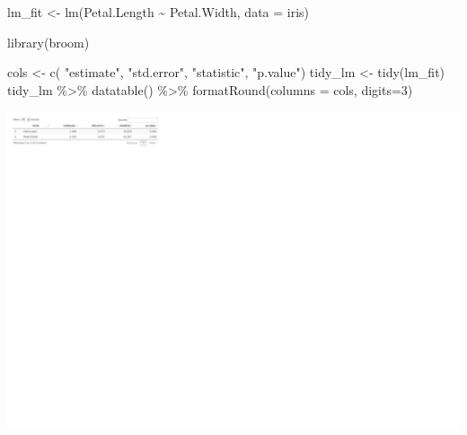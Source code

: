 \documentclass[
  ignorenonframetext,
]{beamer}
\newenvironment{Shaded}{\begin{snugshade}}{\end{snugshade}}
\newcommand{\AttributeTok}[1]{\textcolor[rgb]{0.40,0.45,0.13}{#1}}
\newcommand{\DecValTok}[1]{\textcolor[rgb]{0.68,0.00,0.00}{#1}}
\newcommand{\FunctionTok}[1]{\textcolor[rgb]{0.28,0.35,0.67}{#1}}
\newcommand{\NormalTok}[1]{\textcolor[rgb]{0.00,0.23,0.31}{#1}}
\newcommand{\OtherTok}[1]{\textcolor[rgb]{0.00,0.23,0.31}{#1}}
\newcommand{\SpecialCharTok}[1]{\textcolor[rgb]{0.37,0.37,0.37}{#1}}
\newcommand{\StringTok}[1]{\textcolor[rgb]{0.13,0.47,0.30}{#1}}
\begin{document}
\begin{frame}[fragile]
\begin{Shaded}
\begin{Highlighting}[]
\NormalTok{lm\_fit }\OtherTok{\textless{}{-}} \FunctionTok{lm}\NormalTok{(Petal.Length }\SpecialCharTok{\textasciitilde{}}\NormalTok{ Petal.Width, }\AttributeTok{data =}\NormalTok{ iris)}

\FunctionTok{library}\NormalTok{(broom)}
\end{Highlighting}
\end{Shaded}
\end{frame}

\begin{frame}[fragile]
\begin{Shaded}
\begin{Highlighting}[]
\NormalTok{cols }\OtherTok{\textless{}{-}} \FunctionTok{c}\NormalTok{( }\StringTok{"estimate"}\NormalTok{, }\StringTok{"std.error"}\NormalTok{, }\StringTok{"statistic"}\NormalTok{, }\StringTok{"p.value"}\NormalTok{)}
\NormalTok{tidy\_lm }\OtherTok{\textless{}{-}} \FunctionTok{tidy}\NormalTok{(lm\_fit) }
\NormalTok{tidy\_lm }\SpecialCharTok{\%\textgreater{}\%} \FunctionTok{datatable}\NormalTok{() }\SpecialCharTok{\%\textgreater{}\%}
\FunctionTok{formatRound}\NormalTok{(}\AttributeTok{columns =}\NormalTok{ cols,  }\AttributeTok{digits=}\DecValTok{3}\NormalTok{)}
\end{Highlighting}
\end{Shaded}

\includegraphics{functions_R_files/figure-beamer/unnamed-chunk-3-1.pdf}
\end{frame}
\end{document}
